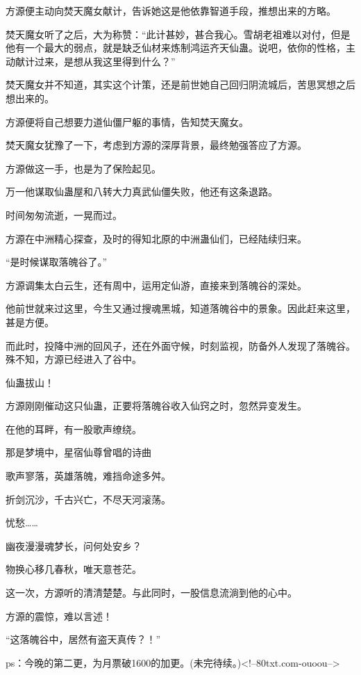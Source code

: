 \begin{this_body}
方源便主动向焚天魔女献计，告诉她这是他依靠智道手段，推想出来的方略。

焚天魔女听了之后，大为称赞：“此计甚妙，甚合我心。雪胡老祖难以对付，但是他有一个最大的弱点，就是缺乏仙材来炼制鸿运齐天仙蛊。说吧，依你的性格，主动献计过来，是想从我这里得到什么？”

焚天魔女并不知道，其实这个计策，还是前世她自己回归阴流城后，苦思冥想之后想出来的。

方源便将自己想要力道仙僵尸躯的事情，告知焚天魔女。

焚天魔女犹豫了一下，考虑到方源的深厚背景，最终勉强答应了方源。

方源做这一手，也是为了保险起见。

万一他谋取仙蛊屋和八转大力真武仙僵失败，他还有这条退路。

时间匆匆流逝，一晃而过。

方源在中洲精心探查，及时的得知北原的中洲蛊仙们，已经陆续归来。

“是时候谋取落魄谷了。”

方源调集太白云生，还有周中，运用定仙游，直接来到落魄谷的深处。

他前世就来过这里，今生又通过搜魂黑城，知道落魄谷中的景象。因此赶来这里，甚是方便。

而此时，投降中洲的回风子，还在外面守候，时刻监视，防备外人发现了落魄谷。殊不知，方源已经进入了谷中。

仙蛊拔山！

方源刚刚催动这只仙蛊，正要将落魄谷收入仙窍之时，忽然异变发生。

在他的耳畔，有一股歌声缭绕。

那是梦境中，星宿仙尊曾唱的诗曲

歌声寥落，英雄落魄，难挡命途多舛。

折剑沉沙，千古兴亡，不尽天河滚荡。

忧愁……

幽夜漫漫魂梦长，问何处安乡？

物换心移几春秋，唯天意苍茫。

这一次，方源听的清清楚楚。与此同时，一股信息流淌到他的心中。

方源的震惊，难以言述！

“这落魄谷中，居然有盗天真传？！”

ps：今晚的第二更，为月票破1600的加更。(未完待续。)<!--80txt.com-ouoou-->

\end{this_body}

